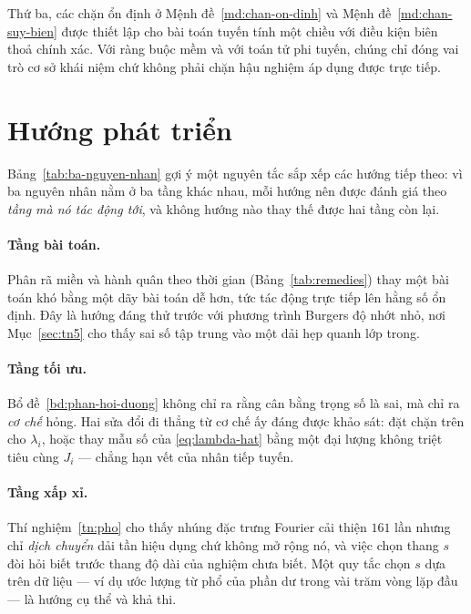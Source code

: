 Thứ ba, các chặn ổn định ở Mệnh đề~\ref{md:chan-on-dinh} và
Mệnh đề~\ref{md:chan-suy-bien} được thiết lập cho bài toán tuyến tính một chiều
với điều kiện biên thoả chính xác. Với ràng buộc mềm và với toán tử phi tuyến,
chúng chỉ đóng vai trò cơ sở khái niệm chứ không phải chặn hậu nghiệm áp dụng
được trực tiếp.

\section{Hướng phát triển}
\label{sec:huong-phat-trien}

Bảng~\ref{tab:ba-nguyen-nhan} gợi ý một nguyên tắc sắp xếp các hướng tiếp theo:
vì ba nguyên nhân nằm ở ba tầng khác nhau, mỗi hướng nên được đánh giá theo
\emph{tầng mà nó tác động tới}, và không hướng nào thay thế được hai tầng còn
lại.

\paragraph{Tầng bài toán.} Phân rã miền và hành quân theo thời gian
(Bảng~\ref{tab:remedies}) thay một bài toán khó bằng một dãy bài toán dễ hơn, tức
tác động trực tiếp lên hằng số ổn định. Đây là hướng đáng thử trước với phương
trình Burgers độ nhớt nhỏ, nơi Mục~\ref{sec:tn5} cho thấy sai số tập trung vào
một dải hẹp quanh lớp trong.

\paragraph{Tầng tối ưu.} Bổ đề~\ref{bd:phan-hoi-duong} không chỉ ra rằng cân bằng
trọng số là sai, mà chỉ ra \emph{cơ chế} hỏng. Hai sửa đổi đi thẳng từ cơ chế
ấy đáng được khảo sát: đặt chặn trên cho $\lambda_i$, hoặc thay mẫu số của
\eqref{eq:lambda-hat} bằng một đại lượng không triệt tiêu cùng $J_i$ --- chẳng
hạn vết của nhân tiếp tuyến.

\paragraph{Tầng xấp xỉ.} Thí nghiệm~\ref{tn:pho} cho thấy nhúng đặc trưng Fourier
cải thiện $161$ lần nhưng chỉ \emph{dịch chuyển} dải tần hiệu dụng chứ không mở
rộng nó, và việc chọn thang $s$ đòi hỏi biết trước thang độ dài của nghiệm chưa
biết. Một quy tắc chọn $s$ dựa trên dữ liệu --- ví dụ ước lượng từ phổ của phần
dư trong vài trăm vòng lặp đầu --- là hướng cụ thể và khả thi.

